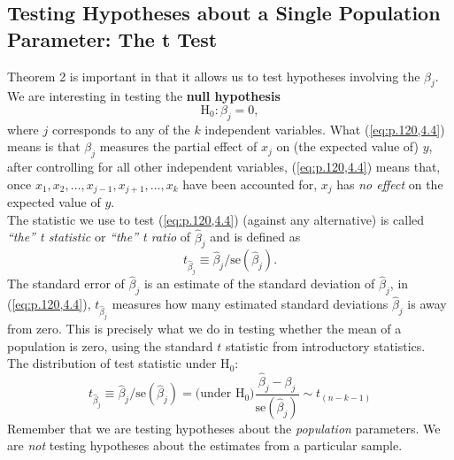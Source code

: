 \documentclass[a4paper, 10pt]{article}
\theoremstyle{definition}	%
\begin{document}
\subsection{Testing Hypotheses about a Single Population Parameter: The t Test}
Theorem 2 is important in that it allows us to test hypotheses involving the $\beta_j$. We are interesting in testing the \textbf{null hypothesis}
\begin{equation}
    \text{H}_0 : \beta_j = 0, \label{eq:p.120,4.4}
\end{equation}
where $j$ corresponds to any of the $k$ independent variables. What (\ref{eq:p.120,4.4}) means is that $\beta_j$ measures the partial effect of $x_j$ on (the expected value of) $y$, after controlling for all other independent variables, (\ref{eq:p.120,4.4}) means that, once $x_1, x_2, \dots, x_{j-1}, x_{j+1}, \dots, x_k$ have been accounted for, $x_j$ has \textit{no effect} on the expected value of $y$.\\
The statistic we use to test (\ref{eq:p.120,4.4}) (against any alternative) is called \textit{“the” t statistic} or \textit{“the” t ratio} of $\hat{\beta}_j$ and is defined as
\begin{equation}
    t_{\hat{\beta}_j} \equiv \hat{\beta}_j / \text{se}(\hat{\beta}_j).
\end{equation}
The standard error of $\hat{\beta}_j$ is an estimate of the standard deviation of $\hat{\beta}_j$, in (\ref{eq:p.120,4.4}), $t_{\hat{\beta}_j}$ measures how many estimated standard deviations $\hat{\beta}_j$ is away from zero. This is precisely what we do in testing whether the mean of a population is zero, using the standard $t$ statistic from introductory statistics.\\
The distribution of test statistic under H$_0$:
\begin{equation*}
    t_{\hat{\beta}_j} \equiv \hat{\beta}_j / \text{se}(\hat{\beta}_j) = \text{(under H$_0$)} \frac{\hat{\beta}_j - \beta_j}{\text{se}(\hat{\beta}_j)} \sim t_{(n-k-1)}
\end{equation*}
Remember that we are testing hypotheses about the \textit{population} parameters. We are \textit{not} testing hypotheses about the estimates from a particular sample.
\end{document}
